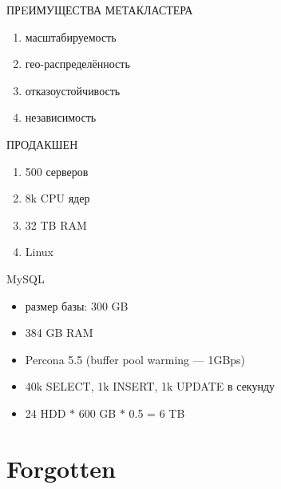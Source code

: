 \documentclass[aspectratio=169]{beamer}
\begin{document}
\begin{frame}{ПРEИМУЩЕСТВА МЕТАКЛАСТЕРА}
    \begin{enumerate}
        \item масштабируемость
        \item гео-распределённость
        \item отказоустойчивость
        \item независимость
    \end{enumerate}
\end{frame}

\begin{frame}{ПРОДАКШЕН}
    \begin{enumerate}
        \item 500 серверов
        \item 8k CPU ядер
        \item 32 TB RAM 
        \item Linux
    \end{enumerate}
\end{frame}

\begin{frame}{MySQL}
    \begin{itemize}
        \item размер базы: 300 GB
        \item 384 GB RAM
        \item Percona 5.5 (buffer pool warming --- 1GBps)
        \item 40k SELECT, 1k INSERT, 1k UPDATE в секунду
        \item 24 HDD $*$ 600 GB $*$ 0.5 = 6 TB
    \end{itemize}
\end{frame}

\section{Forgotten}
{
\begin{frame}[plain]{}
\end{frame}
}
\end{document}
